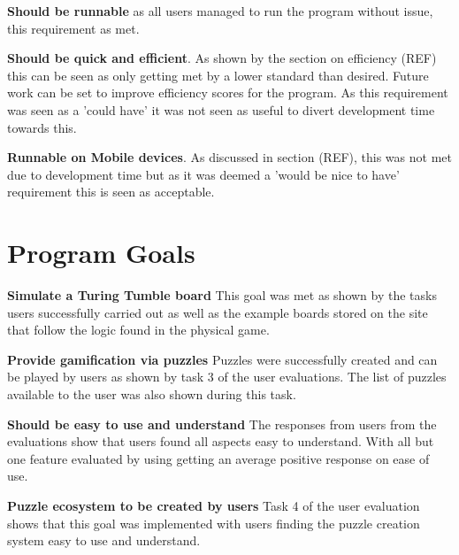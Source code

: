 \documentclass{l4proj}
\begin{document}
\textbf{Should be runnable} as all users managed to run the program without issue, this requirement as met.

\textbf{Should be quick and efficient}. As shown by the section on efficiency (REF) this can be seen as only getting met by a lower standard than desired. Future work can be set to improve efficiency scores for the program. As this requirement was seen as a 'could have' it was not seen as useful to divert development time towards this. 

\textbf{Runnable on Mobile devices}. As discussed in section (REF), this was not met due to development time but as it was deemed a 'would be nice to have' requirement this is seen as acceptable. 

\section{Program Goals}

\textbf{Simulate a Turing Tumble board} This goal was met as shown by the tasks users successfully carried out as well as the example boards stored on the site that follow the logic found in the physical game. 

\textbf{Provide gamification via puzzles} Puzzles were successfully created and can be played by users as shown by task 3 of the user evaluations. The list of puzzles available to the user was also shown during this task.

\textbf{Should be easy to use and understand} The responses from users from the evaluations show that users found all aspects easy to understand. With all but one feature evaluated by using getting an average positive response on ease of use. 

\textbf{Puzzle ecosystem to be created by users} Task 4 of the user evaluation shows that this goal was implemented with users finding the puzzle creation system easy to use and understand.
\end{document}
